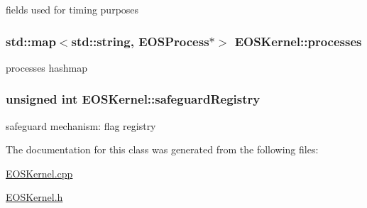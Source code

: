 fields used for timing purposes 

\hypertarget{structEOSKernel_2ef28158d540dabd63d2020e082fa925}{
\subsubsection[{processes}]{\setlength{\rightskip}{0pt plus 5cm}std::map$<$std::string, {\bf EOSProcess}$\ast$$>$ {\bf EOSKernel::processes}}}
\label{structEOSKernel_2ef28158d540dabd63d2020e082fa925}


processes hashmap 

\hypertarget{structEOSKernel_1624f33c49b9fcdd0a0b4a8bd2342267}{
\subsubsection[{safeguardRegistry}]{\setlength{\rightskip}{0pt plus 5cm}unsigned int {\bf EOSKernel::safeguardRegistry}}}
\label{structEOSKernel_1624f33c49b9fcdd0a0b4a8bd2342267}


safeguard mechanism: flag registry 



The documentation for this class was generated from the following files:\begin{CompactItemize}
\item 
\hyperlink{EOSKernel_8cpp}{EOSKernel.cpp}\item 
\hyperlink{EOSKernel_8h}{EOSKernel.h}\end{CompactItemize}
